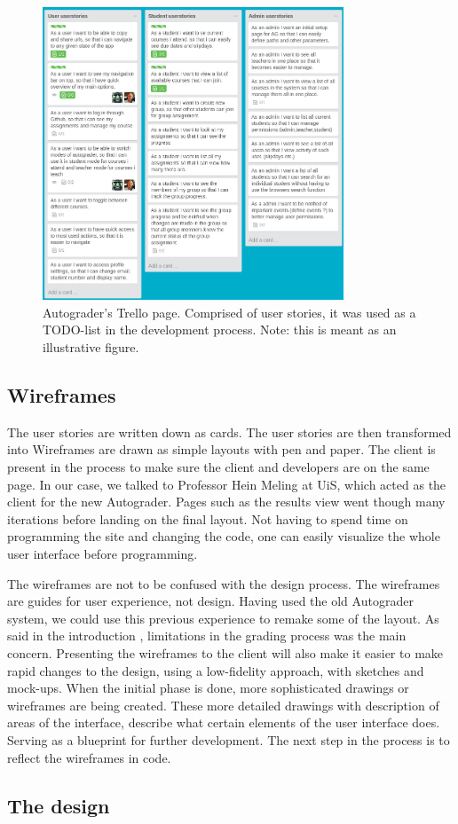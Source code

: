 \begin{figure}[h!]
    \centering
    \includegraphics[width=0.8\textwidth]{./graphs/trello.png}
    \caption{Autograder's Trello page. Comprised of user stories, it was used as a TODO-list in the development process. Note: this is meant as an illustrative figure.}
    \label{fig:View of the trello page we used in the development process}
\end{figure}

\subsection{Wireframes}
The user stories are written down as cards. The user stories are then transformed into Wireframes are drawn as simple layouts with pen and paper. The client is present in the process to make sure the client and developers are on the same page. In our case, we talked to Professor Hein Meling at UiS, which acted as the client for the new Autograder. Pages such as the results view  went though many iterations before landing on the final layout. Not having to spend time on programming the site and changing the code, one can easily visualize the whole user interface before programming.

The wireframes are not to be confused with the design process. The wireframes are guides for user experience, not design. Having used the old Autograder system, we could use this previous experience to remake some of the layout. As said in the introduction , limitations in the grading process was the main concern. Presenting the wireframes to the client will also make it easier to make rapid changes to the design, using a low-fidelity approach, with sketches and mock-ups. When the initial phase is done, more sophisticated drawings or wireframes are being created. These more detailed drawings with description of areas of the interface, describe what certain elements of the user interface does. Serving as a blueprint for further development. The next step in the process is to reflect the wireframes in code.

\subsection{The design}


\todo{}
